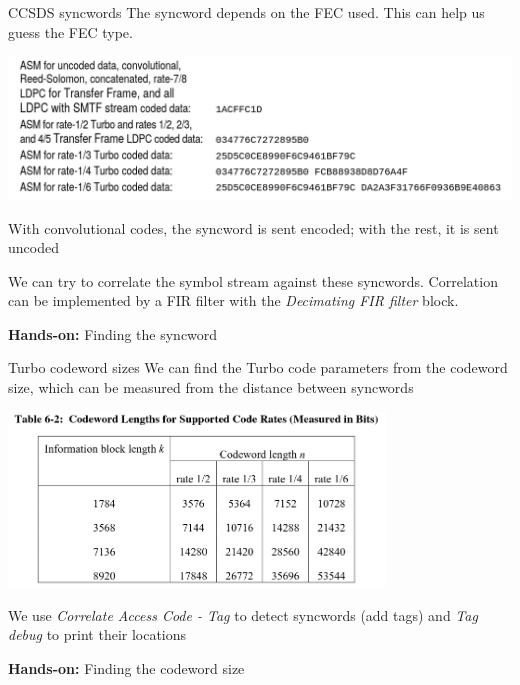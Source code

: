 \documentclass[aspectratio=169]{beamer}
\newcommand{\handson}[1]{\begin{frame}
 \begin{block}{}
   \begin{center}
     \vspace{0.5em}
     {\bf Hands-on:} #1
     \vspace{0.5em}
   \end{center}
 \end{block}
 \end{frame}
}
\begin{document}
\begin{frame}{CCSDS syncwords}
  The syncword depends on the FEC used. This can help us guess the FEC type.

  \begin{center}
    \includegraphics[width=15cm]{syncwords}
  \end{center}

  With convolutional codes, the syncword is sent encoded; with the rest, it is
  sent uncoded

  \medskip

  We can try to correlate the symbol stream against these syncwords. Correlation
  can be implemented by a FIR filter with the \emph{Decimating FIR filter} block.
\end{frame}

\handson{Finding the syncword}

\begin{frame}{Turbo codeword sizes}
  We can find the Turbo code parameters from the codeword size, which can be
  measured from the distance between syncwords

  \begin{center}
    \includegraphics[width=10cm]{codewords}
  \end{center}

  We use \emph{Correlate Access Code - Tag} to detect syncwords (add tags)
  and \emph{Tag debug} to print their locations
\end{frame}

\handson{Finding the codeword size}
\end{document}
